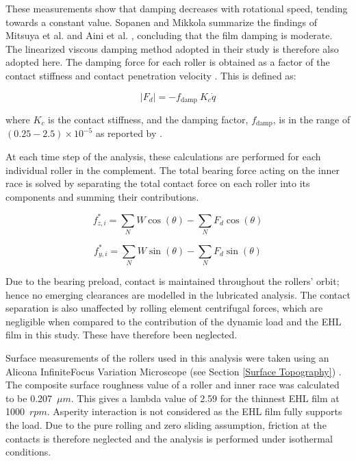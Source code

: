 These measurements show that damping decreases with rotational speed, tending towards a constant value. Sopanen and Mikkola \cite{Sopanen2003_1} summarize the findings of Mitsuya et al. \cite{Mitsuya1992} and Aini et al. \cite{Aini2002}, concluding that the film damping is moderate. The linearized viscous damping method adopted in their study is therefore also adopted here. The damping force for each roller is obtained as a factor of the contact stiffness and contact penetration velocity \cite{Kramer1993}. This is defined as:

\begin{equation}\label{Kramer damping}
	\left|F_d\right|=-f_{\text {damp }} K_c \dot{q}
\end{equation}

where $K_c$ is the contact stiffness, and the damping factor, $f_{\text {damp}}$, is in the range of $(0.25-2.5) \times 10^{-5}$ as reported by \cite{Kramer1993}.

At each time step of the analysis, these calculations are performed for each individual roller in the complement. The total bearing force acting on the inner race is solved by separating the total contact force on each roller into its components and summing their contributions.

\begin{equation}\label{Total bearing force z flexitribo}
	f_{z, i}^*=\sum_N W \cos (\theta)-\sum_N F_d \cos (\theta)
\end{equation}

\begin{equation}\label{Total bearing force y flexitribo}
	f_{y, i}^*=\sum_N W \sin (\theta)-\sum_N F_d \sin (\theta)
\end{equation}

Due to the bearing preload, contact is maintained throughout the rollers’ orbit; hence no emerging clearances are modelled in the lubricated analysis. The contact separation is also unaffected by rolling element centrifugal forces, which are negligible when compared to the contribution of the dynamic load and the EHL film in this study. These have therefore been neglected.

Surface measurements of the rollers used in this analysis were taken using an Alicona InfiniteFocus Variation Microscope (see Section \ref{Surface Topography}) . The composite surface roughness value of a roller and inner race was calculated to be 0.207~$\mu m$. This gives a lambda value of 2.59 for the thinnest EHL film at 1000~$rpm$. Asperity interaction is not considered as the EHL film fully supports the load. Due to the pure rolling and zero sliding assumption, friction at the contacts is therefore neglected and the analysis is performed under isothermal conditions. 

